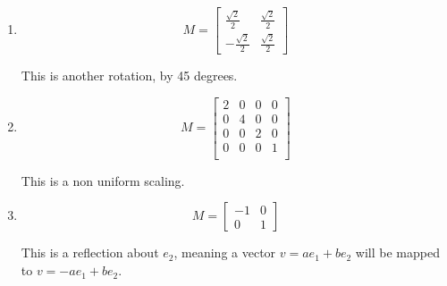 \documentclass{article}
\begin{document}
\begin{enumerate}
\begin{enumerate}
                    \begin{mdframed}
                        This is a rotation by 90 degrees.
                    \end{mdframed}
                \item 
                    \begin{displaymath}
                        M =
                        \begin{bmatrix}
                            \frac{\sqrt{2}}{2} & \frac{\sqrt{2}}{2}\\ 
                            -\frac{\sqrt{2}}{2} & \frac{\sqrt{2}}{2}
                        \end{bmatrix}
                    \end{displaymath}
                    \begin{mdframed}
                       This is another rotation, by 45 degrees. 
                    \end{mdframed}
                \item 
                    \begin{displaymath}
                        M =
                        \begin{bmatrix}
                            2 & 0 & 0 & 0\\
                            0 & 4 & 0 & 0\\
                            0 & 0 & 2 & 0\\
                            0 & 0 & 0 & 1\\
                        \end{bmatrix}
                    \end{displaymath}
                    \begin{mdframed}
                        This is a non uniform scaling.
                    \end{mdframed}
                \item 
                    \begin{displaymath}
                        M = 
                        \begin{bmatrix}
                            -1 & 0\\ 
                            0 & 1
                        \end{bmatrix}
                    \end{displaymath}
                    \begin{mdframed}
                        This is a reflection about $e_2$,
                        meaning a vector $v = ae_1 + be_2$
                        will be mapped to $v = -ae_1 + be_2$.
                    \end{mdframed}


\end{enumerate}
\end{enumerate}
\end{document}
